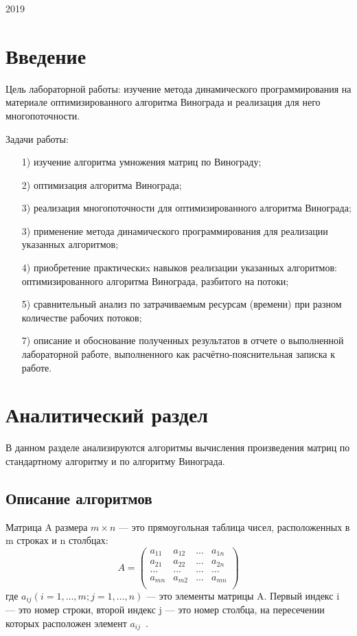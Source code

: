 \documentclass[a4paper,12pt]{article}
\begin{document}
\vspace*{40mm}
\begin{center}
2019    
\end{center}
\thispagestyle{empty}
\pagebreak


\tableofcontents
\pagebreak


\section*{Введение}

Цель лабораторной работы: изучение метода динамического программирования на материале оптимизированного алгоритма Винограда и реализация для него многопоточности.

Задачи работы:
\begin{enumerate} 
	\item[1)] изучение алгоритма умножения матриц по Винограду;
	\item[2)] оптимизация алгоритма Винограда;
	\item[3)] реализация многопоточности для оптимизированного алгоритма Винограда;
	\item[3)] применение метода динамического программирования для реализации указанных алгоритмов;
	\item[4)] приобретение практическиx навыков реализации указанных алгоритмов: оптимизированного алгоритма Винограда, разбитого на потоки;
	\item[5)] сравнительный анализ по затрачиваемым ресурсам (времени) при разном количестве рабочих потоков;
	\item[7)] описание и обоснование полученных результатов в отчете о выполненной лабораторной работе, выполненного как расчётно-пояснительная записка к работе. 
\end{enumerate} 
\pagebreak



\section{Аналитический раздел}
	
	В данном разделе анализируются алгоритмы вычисления произведения матриц по стандартному алгоритму и по алгоритму Винограда. 
	
 
	
	\subsection{Описание алгоритмов}
	Матрица A размера $m \times n$ — это прямоугольная таблица чисел, расположенных в m строках и n столбцах:
	\[A = \begin{pmatrix}
a_{11} & a_{12} & ... & a_{1n}\\
a_{21} & a_{22} & ... & a_{2n}\\
... & ... & ... & ...\\
a_{mn} & a_{m2} & ... & a_{mn}\\
\end{pmatrix} \]
 где $a_{ij} (i = 1, …, m; j =1, …, n)$ — это элементы матрицы A. Первый индекс i — это номер строки, второй индекс j — это номер столбца, на пересечении которых расположен элемент $a_{ij}$~\cite{matr}.
		    
\end{document}
